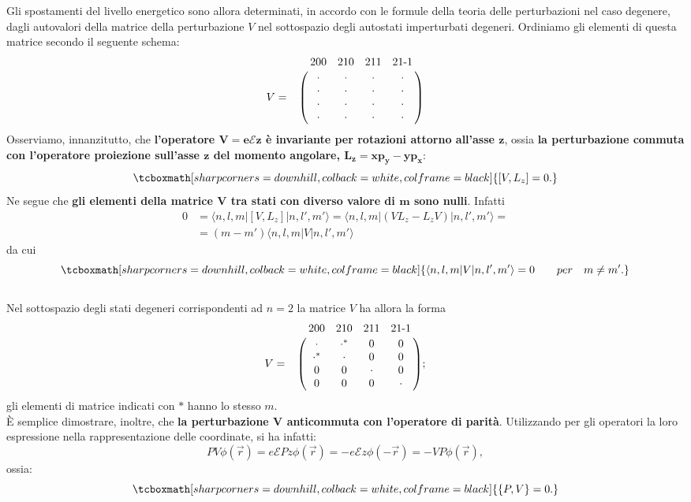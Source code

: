 Gli spostamenti del livello energetico sono allora determinati, in accordo con le formule della teoria delle perturbazioni nel caso degenere, dagli autovalori della matrice della perturbazione $V$ nel sottospazio degli autostati imperturbati degeneri.  Ordiniamo gli elementi di questa matrice secondo il seguente schema:
	\begin{equation}  
		V=
		\bordermatrix{~&200&210&211&21\textrm{-}1\cr
		& \cdot & \cdot & \cdot & \cdot \cr
		& \cdot & \cdot & \cdot & \cdot \cr
		& \cdot & \cdot & \cdot & \cdot \cr
		& \cdot & \cdot & \cdot & \cdot \cr}
		\end{equation}
Osserviamo, innanzitutto, che \textbf{l'operatore $\mathbf{V=e\mathcal{E}z}$ è invariante per rotazioni attorno all'asse $\boldsymbol{z}$}, ossia \textbf{la perturbazione commuta con l'operatore proiezione sull'asse $\boldsymbol{z}$ del momento angolare, $\boldsymbol{L_z=xp_y-yp_x}$}:
	\begin{equation} 
		\tcboxmath[sharp corners=downhill, colback=white, colframe=black]{
			\left[V,L_z\right]=0.
			}
	\end{equation}
Ne segue che \textbf{gli elementi della matrice $\boldsymbol{V}$ tra stati con diverso valore di $\boldsymbol{m}$ sono nulli}. Infatti 
	\begin{align} 
		0 & =  \langle n,l,m| \left[V,L_z\right] |n,l',m'\rangle = \langle n,l,m | \left(VL_z-L_zV\right)|n,l',m'\rangle= \nonumber \\
		 & = \left( m-m' \right) \langle n,l,m |V |n,l',m'\rangle
	\end{align}
da cui
	\begin{equation}
		\tcboxmath[sharp corners=downhill, colback=white, colframe=black]{
			\langle n,l,m | V |n,l',m'\rangle=0 \qquad per \quad m \neq m'.
			}
	\end{equation}\\
	
Nel sottospazio degli stati degeneri corrispondenti ad $n=2$ la matrice $V$ ha allora la forma
	\begin{equation} 
		V=
		\bordermatrix{~&200&210&211&21\textrm{-}1\cr
		& \cdot & \cdot^{*} & 0 & 0 \cr
		& \cdot^{*} & \cdot & 0 & 0 \cr
		& 0 & 0 & \cdot & 0 \cr
		& 0 & 0 & 0 & \cdot \cr} ;
	\end{equation}
gli elementi di matrice indicati con $*$ hanno lo stesso $m$.\\

È semplice dimostrare, inoltre, che \textbf{la perturbazione $\boldsymbol{V}$ anticommuta con l'operatore di parità}. Utilizzando per gli operatori la loro espressione nella rappresentazione delle coordinate, si ha infatti:
	\begin{equation}
		PV\phi(\vec{r})=e\mathcal{E}Pz\phi(\vec{r})=-e\mathcal{E}z\phi(-\vec{r})=-VP\phi(\vec{r}),
	\end{equation}
ossia:
	\begin{equation} 
		\tcboxmath[sharp corners=downhill, colback=white, colframe=black]{
			\{P,V\}=0.
			}
	\end{equation}\\
	
